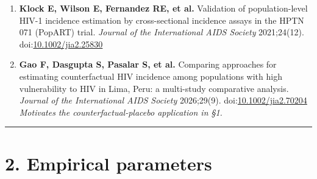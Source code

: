 \begin{enumerate}
  \emph{PT-RITA. Repairs misclassification rather than selection; see Discussion.}
\item
  \textbf{Klock E, Wilson E, Fernandez RE, et al.} Validation of population-level HIV-1 incidence estimation by cross-sectional incidence assays in the HPTN 071 (PopART) trial. \emph{Journal of the International AIDS Society} 2021;24(12). doi:\href{https://doi.org/10.1002/jia2.25830}{10.1002/jia2.25830}
\item
  \textbf{Gao F, Dasgupta S, Pasalar S, et al.} Comparing approaches for estimating counterfactual HIV incidence among populations with high vulnerability to HIV in Lima, Peru: a multi-study comparative analysis. \emph{Journal of the International AIDS Society} 2026;29(9). doi:\href{https://doi.org/10.1002/jia2.70204}{10.1002/jia2.70204}
  \emph{Motivates the counterfactual-placebo application in §1.}
\end{enumerate}

\begin{center}\rule{0.5\linewidth}{0.5pt}\end{center}

\section{2. Empirical parameters}


